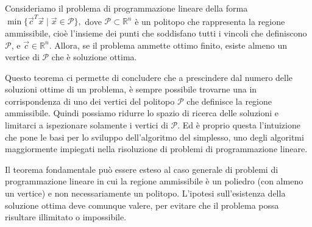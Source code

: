 \begin{LPTheorem}
Consideriamo il problema di programmazione lineare della
forma
\(
    \min \{\vec{c}^T\vec{x} \mid
    \vec{x} \in \mathcal{P} \},
\)
dove $\mathcal{P} \subset \mathbb{R}^n$ è un politopo che rappresenta la
regione ammissibile, cioè l'insieme dei punti che soddisfano tutti i
vincoli che definiscono $\mathcal{P}$, e $\vec{c} \in \mathbb{R}^n$. Allora,
se il problema ammette ottimo finito, esiste almeno un vertice di
$\mathcal{P}$ che è soluzione ottima.
\end{LPTheorem}
Questo teorema ci permette di concludere che a prescindere dal numero delle
soluzioni ottime di un problema, è sempre possibile trovarne una in
corrispondenza di uno dei vertici del politopo $\mathcal{P}$ che definisce
la regione ammissibile. Quindi possiamo ridurre lo spazio di ricerca delle
soluzioni e limitarci a ispezionare solamente i vertici di $\mathcal{P}$.
Ed è proprio questa l'intuizione che pone le basi per lo sviluppo
dell'algoritmo del simplesso, uno degli algoritmi maggiormente impiegati
nella risoluzione di problemi di programmazione lineare.

Il teorema fondamentale può essere esteso al caso generale di problemi di
programmazione lineare in cui la regione ammissibile è un poliedro (con
almeno un vertice) e non necessariamente un politopo. L'ipotesi
sull'esistenza della soluzione ottima deve comunque valere, per evitare che
il problema possa risultare illimitato o impossibile.

